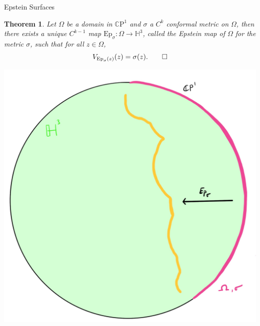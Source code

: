 \documentclass[professionalfont]{beamer}
\newcommand{\CP}{\mathbb{C}\mathrm{P}}
\renewcommand{\H}{\mathbb{H}}
\newtheorem{thm}{Theorem}[section]
\begin{document}
\begin{frame}{Epstein Surfaces}


\begin{thm}
Let $\Omega$ be a domain in $\CP^1$  and $\sigma$ a $C^k$ conformal metric on $\Omega$, then there exists a unique $C^{k-1}$ map $\mathrm{Ep}_\sigma : \Omega \to \H^3$, called the Epstein map of $\Omega$ for the metric $\sigma$, such that for all $z \in \Omega$,
\[
V_{\mathrm{Ep}_\sigma(z)}(z) = \sigma(z). \qed
\]
\end{thm}


\centering\includegraphics[scale=0.06]{Epstein-5.jpg}

\end{frame}


\end{document}
